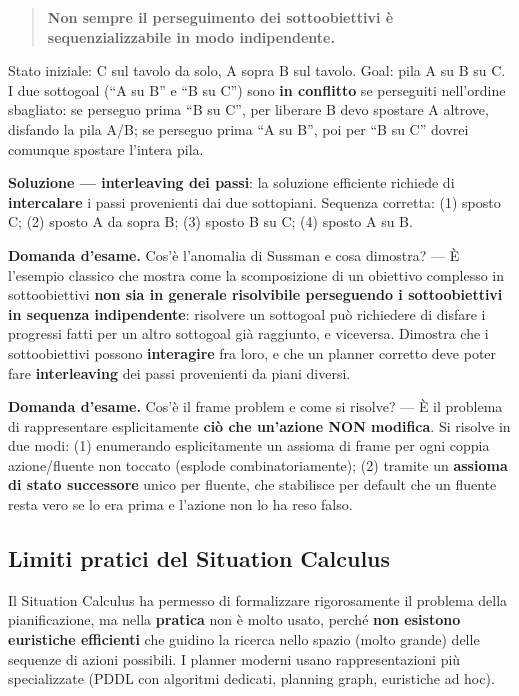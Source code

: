\documentclass[11pt,a4paper]{report}
\newcommand{\domandaesame}[1]{\begin{esame}\textbf{Domanda d'esame.} #1\end{esame}}
\begin{document}
\begin{quote}
\textbf{Non sempre il perseguimento dei sottoobiettivi è sequenzializzabile in modo indipendente.}
\end{quote}

Stato iniziale: C sul tavolo da solo, A sopra B sul tavolo. Goal: pila A su B su C. I due sottogoal (``A su B'' e ``B su C'') sono \textbf{in conflitto} se perseguiti nell'ordine sbagliato: se perseguo prima ``B su C'', per liberare B devo spostare A altrove, disfando la pila A/B; se perseguo prima ``A su B'', poi per ``B su C'' dovrei comunque spostare l'intera pila.

\textbf{Soluzione --- interleaving dei passi}: la soluzione efficiente richiede di \textbf{intercalare} i passi provenienti dai due sottopiani. Sequenza corretta: (1) sposto C; (2) sposto A da sopra B; (3) sposto B su C; (4) sposto A su B.

\domandaesame{Cos'è l'anomalia di Sussman e cosa dimostra? --- È l'esempio classico che mostra come la scomposizione di un obiettivo complesso in sottoobiettivi \textbf{non sia in generale risolvibile perseguendo i sottoobiettivi in sequenza indipendente}: risolvere un sottogoal può richiedere di disfare i progressi fatti per un altro sottogoal già raggiunto, e viceversa. Dimostra che i sottoobiettivi possono \textbf{interagire} fra loro, e che un planner corretto deve poter fare \textbf{interleaving} dei passi provenienti da piani diversi.}

\domandaesame{Cos'è il frame problem e come si risolve? --- È il problema di rappresentare esplicitamente \textbf{ciò che un'azione NON modifica}. Si risolve in due modi: (1) enumerando esplicitamente un assioma di frame per ogni coppia azione/fluente non toccato (esplode combinatoriamente); (2) tramite un \textbf{assioma di stato successore} unico per fluente, che stabilisce per default che un fluente resta vero se lo era prima e l'azione non lo ha reso falso.}

\subsection{Limiti pratici del Situation Calculus}

Il Situation Calculus ha permesso di formalizzare rigorosamente il problema della pianificazione, ma nella \textbf{pratica} non è molto usato, perché \textbf{non esistono euristiche efficienti} che guidino la ricerca nello spazio (molto grande) delle sequenze di azioni possibili. I planner moderni usano rappresentazioni più specializzate (PDDL con algoritmi dedicati, planning graph, euristiche ad hoc).
\end{document}

